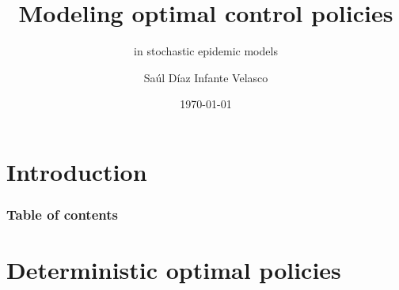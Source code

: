 \documentclass[9pt]{beamer}
\title{Modeling optimal control policies}
\subtitle{in stochastic epidemic models}
\author{Saúl Díaz Infante Velasco}
\institute{CONACYT-UNIVERSIDAD de SONORA}
\date{\today}
\begin{document}
    \titlepage
    \section{Introduction}
        
    \begin{frame}
        \frametitle{Table of contents}
        \tableofcontents
    \end{frame}
    \section{Deterministic optimal policies}
        
        
\end{document}
